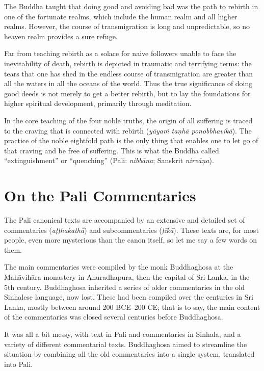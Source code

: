 \documentclass[12pt,openany]{book}%
\begin{document}
The Buddha taught that doing good and avoiding bad was the path to rebirth in one of the fortunate realms, which include the human realm and all higher realms. However, the course of transmigration is long and unpredictable, so no heaven realm provides a sure refuge.

Far from teaching rebirth as a solace for naive followers unable to face the inevitability of death, rebirth is depicted in traumatic and terrifying terms: the tears that one has shed in the endless course of transmigration are greater than all the waters in all the oceans of the world. Thus the true significance of doing good deeds is not merely to get a better rebirth, but to lay the foundations for higher spiritual development, primarily through meditation.

In the core teaching of the four noble truths, the origin of all suffering is traced to the craving that is connected with rebirth (\textit{\textsanskrit{yāyaṁ} \textsanskrit{taṇhā} \textsanskrit{ponobbhavikā}}). The practice of the noble eightfold path is the only thing that enables one to let go of that craving and be free of suffering. This is what the Buddha called “extinguishment” or “quenching” (Pali: \textit{\textsanskrit{nibbāna}}; Sanskrit \textit{\textsanskrit{nirvāṇa}}).

\section*{On the Pali Commentaries}

The Pali canonical texts are accompanied by an extensive and detailed set of commentaries (\textit{\textsanskrit{aṭṭhakathā}}) and subcommentaries (\textit{\textsanskrit{ṭīkā}}). These texts are, for most people, even more mysterious than the canon itself, so let me say a few words on them.

The main commentaries were compiled by the monk Buddhaghosa at the \textsanskrit{Mahāvihāra} monastery in Anuradhapura, then the capital of Sri Lanka, in the 5th century. Buddhaghosa inherited a series of older commentaries in the old Sinhalese language, now lost. These had been compiled over the centuries in Sri Lanka, mostly between around 200 BCE–200 CE; that is to say, the main content of the commentaries was closed several centuries before Buddhaghosa.

It was all a bit messy, with text in Pali and commentaries in Sinhala, and a variety of different commentarial texts. Buddhaghosa aimed to streamline the situation by combining all the old commentaries into a single system, translated into Pali.
\end{document}
